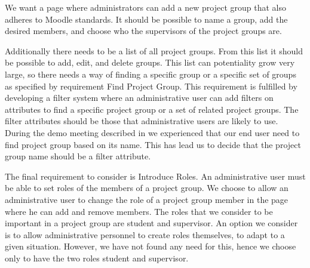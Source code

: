 We want a page where administrators can add a new project group that also adheres to Moodle standards.
It should be possible to name a group, add the desired members, and choose who the supervisors of the project groups are.

Additionally there needs to be a list of all project groups.
From this list it should be possible to add, edit, and delete groups. 
This list can potentiality grow very large, so there needs a way of finding a specific group or a specific set of groups as specified by requirement Find Project Group.
This requirement is fulfilled by developing a filter system where an administrative user can add filters on attributes to find a specific project group or a set of related project groups.
The filter attributes should be those that administrative users are likely to use.
During the demo meeting described in  we experienced that our end user need to find project group based on its name.
This has lead us to decide that the project group name should be a filter attribute.

The final requirement to consider is Introduce Roles.
An administrative user must be able to set roles of the members of a project group.
We choose to allow an administrative user to change the role of a project group member in the page where he can add and remove members.
The roles that we consider to be important in a project group are student and supervisor.
An option we consider is to allow administrative personnel to create roles themselves, to adapt to a given situation.
However, we have not found any need for this, hence we choose only to have the two roles student and supervisor.






